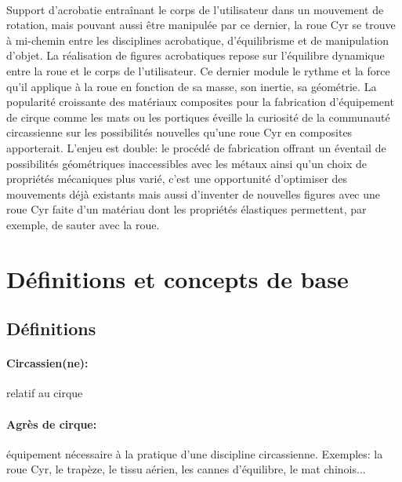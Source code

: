 
\label{sec:Introduction}  %

\\
Support d'acrobatie entraînant le corps de l'utilisateur dans un mouvement de rotation, mais pouvant aussi être manipulée par ce dernier, la roue Cyr se trouve à mi-chemin entre les disciplines acrobatique, d'équilibrisme et de manipulation d'objet. La réalisation de figures acrobatiques repose sur l'équilibre dynamique entre la roue et le corps de l'utilisateur. Ce dernier module le rythme et la force qu'il applique à la roue en fonction de sa masse, son inertie, sa géométrie. La popularité croissante des matériaux composites pour la fabrication d'équipement de cirque comme les mats ou les portiques éveille la curiosité de la communauté circassienne sur les possibilités nouvelles qu'une roue Cyr en composites apporterait. L'enjeu est double: le procédé de fabrication offrant un éventail de possibilités géométriques inaccessibles avec les métaux ainsi qu'un choix de propriétés mécaniques plus varié, c'est une opportunité d'optimiser des mouvements déjà existants mais aussi d'inventer de nouvelles figures avec une roue Cyr faite d'un matériau dont les propriétés élastiques permettent, par exemple, de sauter avec la roue.
\section{Définitions et concepts de base}  %

\subsection{Définitions}
\paragraph{Circassien(ne):} relatif au cirque 
\paragraph{Agrès de cirque:} équipement nécessaire à la pratique d'une discipline circassienne. Exemples: la roue Cyr, le trapèze, le tissu aérien, les cannes d'équilibre, le mat chinois...
